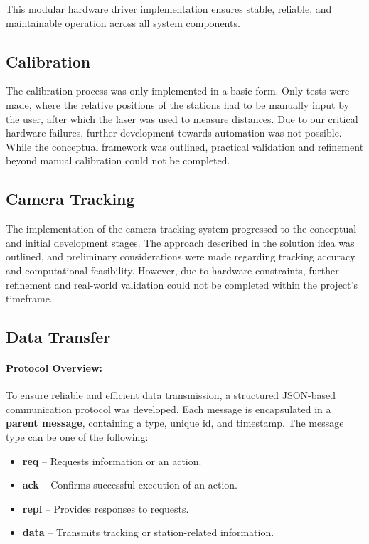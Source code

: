 This modular hardware driver implementation ensures stable, reliable, and maintainable operation across all system components.


\subsection{Calibration}

The calibration process was only implemented in a basic form. Only tests were made, where the relative positions of the stations had to be manually input by the user, after which the laser was used to measure distances. Due to our critical hardware failures, further development towards automation was not possible. While the conceptual framework was outlined, practical validation and refinement beyond manual calibration could not be completed.

\subsection{Camera Tracking}

The implementation of the camera tracking system progressed to the conceptual and initial development stages. The approach described in the solution idea was outlined, and preliminary considerations were made regarding tracking accuracy and computational feasibility. However, due to hardware constraints, further refinement and real-world validation could not be completed within the project's timeframe.

\newpage

\subsection{Data Transfer}\label{subsec:DataTransfer}


\paragraph{Protocol Overview:}

To ensure reliable and efficient data transmission, a structured JSON-based communication protocol was developed. Each message is encapsulated in a \textbf{parent message}, containing a type, unique \acrfull{id}, and timestamp. The message type can be one of the following:

\begin{itemize}
	\item \textbf{req} – Requests information or an action.
	\item \textbf{ack} – Confirms successful execution of an action.
	\item \textbf{repl} – Provides responses to requests.
	\item \textbf{data} – Transmits tracking or station-related information.
\end{itemize}

